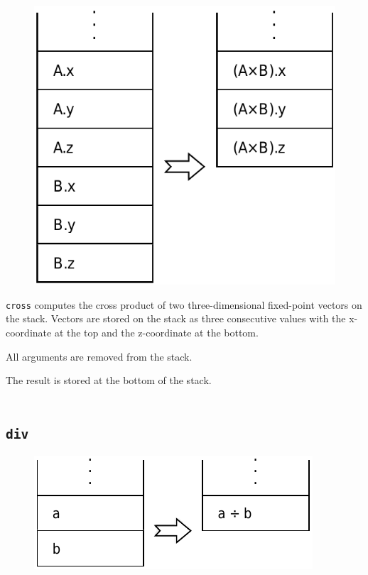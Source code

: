 		\begin{figure}
			\begin{flushright}
				\includegraphics[width=\linewidth]{figure/pdf/i_cross} 
			\end{flushright}
		\end{figure}
	
			\texttt{cross} computes the cross product of two three-dimensional
			fixed-point vectors on the stack. Vectors are stored on the stack
			as three consecutive values with the x-coordinate at the top and
			the z-coordinate at the bottom.
			
			All arguments are removed from the stack.
			
			The result is stored at the bottom of the stack.\\\\
	
	\qquad\qquad
	
	\subsection*{\texttt{div}}
	
		\begin{figure}
			\begin{flushright}
				\includegraphics[width=\linewidth]{figure/pdf/i_div} 
			\end{flushright}
		\end{figure}
	
